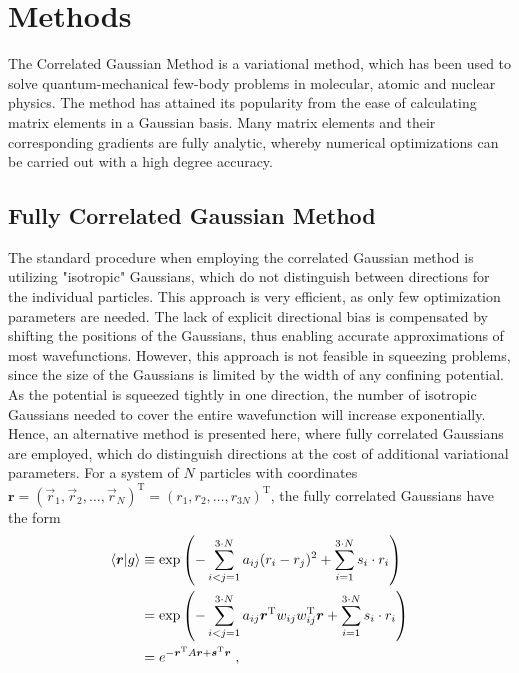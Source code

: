 \chapter{Methods}

The Correlated Gaussian Method is a variational method, which has been used to solve quantum-mechanical few-body problems in molecular, atomic and nuclear physics. The method has attained its popularity from the ease of calculating matrix elements in a Gaussian basis. Many matrix elements and their corresponding gradients are fully analytic, whereby numerical optimizations can be carried out with a high degree accuracy.


\section{Fully Correlated Gaussian Method}
The standard procedure when employing the correlated Gaussian method is utilizing "isotropic" Gaussians, which do not distinguish between directions for the individual particles. This approach is very efficient, as only few optimization parameters are needed. The lack of explicit directional bias is compensated by shifting the positions of the Gaussians, thus enabling accurate approximations of most wavefunctions. However, this approach is not feasible in squeezing problems, since the size of the Gaussians is limited by the width of any confining potential. As the potential is squeezed tightly in one direction, the number of isotropic Gaussians needed to cover the entire wavefunction will increase exponentially.
Hence, an alternative method is presented here, where fully correlated Gaussians are employed, which do distinguish directions at the cost of additional variational parameters. 
For a system of $N$ particles with coordinates $\boldsymbol{r} = (\vec{r}_1 , \vec{r}_2 , \ldots , \vec{r}_N)^{\mathrm{T}} = (r_1 , r_2 , \ldots , r_{3 N})^{\mathrm{T}}$, the fully correlated Gaussians have the form
\begin{align}
 \braket{ \boldsymbol{r} | g }  &\equiv  \exp \left( - \sum_{i < j = 1}^{3 \cdot N} a_{ij} (r_i - r_j)^2 + \sum_{i=1}^{3 \cdot N} s_i \cdot r_i \right)  \nonumber \\
  &=   \exp \left( - \sum_{i < j = 1}^{3 \cdot N} a_{ij} \boldsymbol{r}^{\mathrm{T}} w_{ij} w_{ij}^{\mathrm{T}} \boldsymbol{r} + \sum_{i=1}^{3 \cdot N} s_i \cdot r_i \right) \nonumber \\
 &=  e^{-\boldsymbol{r}^{\mathrm{T}} A \boldsymbol{r} + \boldsymbol{s}^{\mathrm{T}} \boldsymbol{r} } \; ,
\end{align}
